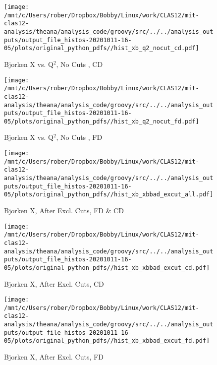 \documentclass{article}
\begin{document}
\begin{landscape}
    \begin{figure}[h]
        \centering

        \texttt{[image: /mnt/c/Users/rober/Dropbox/Bobby/Linux/work/CLAS12/mit-clas12-analysis/theana/analysis\_code/groovy/src/../../analysis\_outputs/output\_file\_histos-20201011-16-05/plots/original\_python\_pdfs//hist\_xb\_q2\_nocut\_cd.pdf]}
        \captionsetup{textformat=empty,labelformat=blank}
        \caption{Bjorken X vs. Q$^{2}$, No Cuts , CD}
    \end{figure}
    \clearpage
    
    \begin{figure}[h]
        \centering

        \texttt{[image: /mnt/c/Users/rober/Dropbox/Bobby/Linux/work/CLAS12/mit-clas12-analysis/theana/analysis\_code/groovy/src/../../analysis\_outputs/output\_file\_histos-20201011-16-05/plots/original\_python\_pdfs//hist\_xb\_q2\_nocut\_fd.pdf]}
        \captionsetup{textformat=empty,labelformat=blank}
        \caption{Bjorken X vs. Q$^{2}$, No Cuts , FD}
    \end{figure}
    \clearpage
    
    \begin{figure}[h]
        \centering

        \texttt{[image: /mnt/c/Users/rober/Dropbox/Bobby/Linux/work/CLAS12/mit-clas12-analysis/theana/analysis\_code/groovy/src/../../analysis\_outputs/output\_file\_histos-20201011-16-05/plots/original\_python\_pdfs//hist\_xb\_xbbad\_excut\_all.pdf]}
        \captionsetup{textformat=empty,labelformat=blank}
        \caption{Bjorken X, After Excl. Cuts, FD \& CD}
    \end{figure}
    \clearpage
    
    \begin{figure}[h]
        \centering

        \texttt{[image: /mnt/c/Users/rober/Dropbox/Bobby/Linux/work/CLAS12/mit-clas12-analysis/theana/analysis\_code/groovy/src/../../analysis\_outputs/output\_file\_histos-20201011-16-05/plots/original\_python\_pdfs//hist\_xb\_xbbad\_excut\_cd.pdf]}
        \captionsetup{textformat=empty,labelformat=blank}
        \caption{Bjorken X, After Excl. Cuts, CD}
    \end{figure}
    \clearpage
    
    \begin{figure}[h]
        \centering

        \texttt{[image: /mnt/c/Users/rober/Dropbox/Bobby/Linux/work/CLAS12/mit-clas12-analysis/theana/analysis\_code/groovy/src/../../analysis\_outputs/output\_file\_histos-20201011-16-05/plots/original\_python\_pdfs//hist\_xb\_xbbad\_excut\_fd.pdf]}
        \captionsetup{textformat=empty,labelformat=blank}
        \caption{Bjorken X, After Excl. Cuts, FD}
    \end{figure}
    \clearpage
    

\end{landscape}
\end{document}
